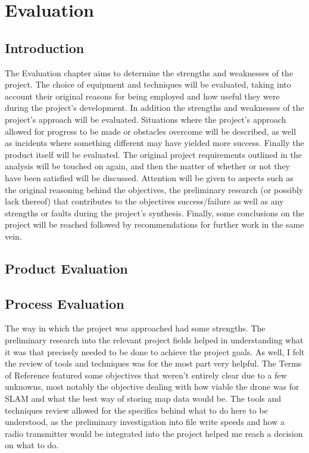 \part{Evaluation}
	\chapter{Introduction}
	The Evaluation chapter aims to determine the strengths and weaknesses of the project. The choice of equipment and techniques will be evaluated, taking into account their original reasons for being employed and how useful they were during the project's development. In addition the strengths and weaknesses of the project's approach will be evaluated. Situations where the project's approach allowed for progress to be made or obstacles overcome will be described, as well as incidents where something different may have yielded more success. Finally the product itself will be evaluated. The original project requirements outlined in the analysis will be touched on again, and then the matter of whether or not they have been satisfied will be discussed. Attention will be given to aspects such as the original reasoning behind the objectives, the preliminary research (or possibly lack thereof) that contributes to the objectives success/failure as well as any strengths or faults during the project's synthesis. Finally, some conclusions on the project will be reached followed by recommendations for further work in the same vein. 
	
	\chapter{Product Evaluation}
	
	
	
	
	\chapter{Process Evaluation}
	\label{evaluation:processevaluation}
	
	The way in which the project was approached had some strengths. The preliminary research into the relevant project fields helped in understanding what it was that precisely needed to be done to achieve the project goals. As well, I felt the review of tools and techniques was for the most part very helpful. The Terms of Reference featured some objectives that weren't entirely clear due to a few unknowns, most notably the objective dealing with how viable the drone was for SLAM and what the best way of storing map data would be. The tools and techniques review allowed for the specifics behind what to do here to be understood, as the preliminary investigation into file write speeds and how a radio transmitter would be integrated into the project helped me reach a decision on what to do.
	
